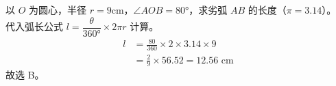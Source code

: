 \documentclass[12pt,a4paper]{exam-zh}
\makeatletter
\newcounter{answerkeyquestion}
\let\originalparen\paren
\newcommand{\answerkeyitems}{}
\newcommand{\addanswerkeyitem}[2]{%
  \pgfmathtruncatemacro{\row}{ifthenelse(#1<=\cols,0,1)}%
  \pgfmathtruncatemacro{\col}{mod(#1-1,\cols)}%
  \pgfmathsetlengthmacro{\x}{\col*\boxw}%
  \pgfmathsetlengthmacro{\y}{-\row*\boxh}%
  \draw (\x,\y) rectangle ++(\boxw,\boxh);%
  \node[anchor=north west] at (\x+\offset,\y+\boxh-\offset) {\textbf{#1.}};%
  \node at (\x+0.6*\boxw,\y+0.45*\boxh) {\Large\textbf{#2}};%
}
\renewcommand{\paren}[1][]{%
  \originalparen[#1]%
  \edef\answerkeytemp{#1}%
  \ifx\answerkeytemp\@empty\else
    \stepcounter{answerkeyquestion}%
    \begingroup
      \edef\x{\endgroup
        \noexpand\g@addto@macro\noexpand\answerkeyitems{\noexpand\addanswerkeyitem{\theanswerkeyquestion}{#1}}}%
    \x
  \fi
}
\makeatother
\begin{document}
\begin{solution}
    以 $O$ 为圆心，半径 $r=9\text{cm}$，$\angle AOB=80°$，求劣弧 $AB$ 的长度（$\pi=3.14$）。\\
    代入弧长公式 $l=\dfrac{\theta}{360°}\times2\pi r$ 计算。
    \begin{align*}
        l &= \frac{80}{360}\times2\times3.14\times9 \\
        &= \frac{2}{9}\times56.52 = 12.56 \text{ cm}
    \end{align*}
    故选 B。
\end{solution}


    

    

    

\end{document}
